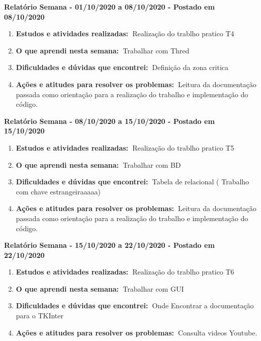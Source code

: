 \documentclass[10pt,a4paper]{report}
\newcommand{\bola}{\resizebox{12pt}{!}{$\bullet$\ }}
\newcommand{\relatorio}[3]{\vspace{3mm}\noindent\bola\textbf{Relatório Semana - #1 a #2 - Postado em #3}}
\newcommand{\atividades}{\textbf{Estudos e atividades realizadas:\ }}
\newcommand{\aprendizado}{\textbf{O que aprendi nesta semana:\ }}
\newcommand{\duvidas}{\textbf{Dificuldades e dúvidas que encontrei:\ }}
\newcommand{\acoes}{\textbf{Ações e atitudes para resolver os problemas:\ }}
\begin{document}
\relatorio{01/10/2020}{08/10/2020}{08/10/2020}
\begin{enumerate}
	\item \atividades Realização do trablho pratico T4
	
	\item \aprendizado Trabalhar com Thred
	
	\item \duvidas Definição da zona critica
	
	\item \acoes Leitura da documentação passada como orientação para a realização do trabalho e implementação do código.
\end{enumerate}

\relatorio{08/10/2020}{15/10/2020}{15/10/2020}
\begin{enumerate}
	\item \atividades Realização do trablho pratico T5
	
	\item \aprendizado Trabalhar com BD
	
	\item \duvidas Tabela de relacional ( Trabalho com chave estrangeiraaaaa)
	
	\item \acoes Leitura da documentação passada como orientação para a realização do trabalho e implementação do código.
\end{enumerate}

\relatorio{15/10/2020}{22/10/2020}{22/10/2020}
\begin{enumerate}
	\item \atividades Realização do trablho pratico T6
	
	\item \aprendizado Trabalhar com GUI
	
	\item \duvidas Onde Encontrar a documentação para o TKInter
	
	\item \acoes Consulta videos Youtube.
\end{enumerate}
\end{document}
